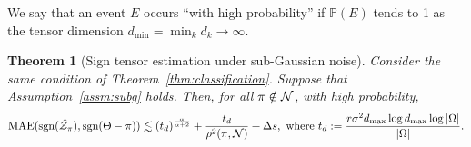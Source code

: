 \documentclass[11pt]{article}
\theoremstyle{plain}
\newtheorem{thm}{Theorem}[section]
\theoremstyle{definition}
\begin{document}
We say that an event $E$ occurs ``with high probability'' if $\mathbb{P}(E)$ tends to 1 as the tensor dimension $d_{\min}=\min_k d_k\to \infty$. 
\begin{thm}[Sign tensor estimation under sub-Gaussian noise]\label{thm:unbddno1}
Consider the same condition of Theorem~\ref{thm:classification}.   Suppose that Assumption~\ref{assm:subg} holds. Then, for all $\pi\notin \mathcal{N}$, with high probability,
\begin{align}
 \textup{MAE}(\textup{sgn}(\hat {\mathcal{Z}}_\pi),\textup{sgn}(\Theta-\pi))\lesssim \left(t_d\right)^{\alpha\over \alpha+2}+\frac{t_d}{\rho^2(\pi,\mathcal{N})}+\Delta s, \text{ where } t_d :={ r\sigma^2d_{\max}\log d_{\max}\log |\Omega|\over |\Omega|}.
\end{align}
\end{thm}
\end{document}
